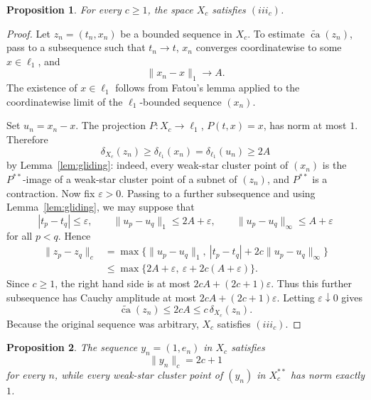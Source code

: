 \documentclass[11pt]{article}
\newtheorem{proposition}{Proposition}
\newcommand{\ellone}{\ell_1}
\newcommand{\wca}{\widetilde{\operatorname{ca}}}
\begin{document}
\begin{proposition}\label{prop:iii}
For every \(c\ge1\), the space \(X_c\) satisfies \((iii_c)\).
\end{proposition}

\begin{proof}
Let \(z_n=(t_n,x_n)\) be a bounded sequence in \(X_c\).  To estimate
\(\wca(z_n)\), pass to a subsequence such that \(t_n\to t\), \(x_n\) converges
coordinatewise to some \(x\in\ellone\), and
\[
  \|x_n-x\|_1\longrightarrow A.
\]
The existence of \(x\in\ellone\) follows from Fatou's lemma applied to the
coordinatewise limit of the \(\ellone\)-bounded sequence \((x_n)\).

Set \(u_n=x_n-x\).  The projection \(P:X_c\to\ellone\), \(P(t,x)=x\), has
norm at most \(1\).  Therefore
\[
  \delta_{X_c}(z_n)\ge \delta_{\ellone}(x_n)
  =\delta_{\ellone}(u_n)\ge 2A
\]
by Lemma~\ref{lem:gliding}: indeed, every weak-star cluster point of
\((x_n)\) is the \(P^{**}\)-image of a weak-star cluster point of a subnet of
\((z_n)\), and \(P^{**}\) is a contraction.  Now fix \(\varepsilon>0\).  Passing to a further
subsequence and using Lemma~\ref{lem:gliding}, we may suppose that
\[
  |t_p-t_q|\le\varepsilon,\qquad
  \|u_p-u_q\|_1\le2A+\varepsilon,\qquad
  \|u_p-u_q\|_\infty\le A+\varepsilon
\]
for all \(p<q\).  Hence
\[
\begin{aligned}
  \|z_p-z_q\|_c
  &=
  \max\{\|u_p-u_q\|_1,\ |t_p-t_q|+2c\|u_p-u_q\|_\infty\} \\
  &\le
  \max\{2A+\varepsilon,\ \varepsilon+2c(A+\varepsilon)\}.
\end{aligned}
\]
Since \(c\ge1\), the right hand side is at most
\(2cA+(2c+1)\varepsilon\).  Thus this further subsequence has Cauchy
amplitude at most \(2cA+(2c+1)\varepsilon\).  Letting
\(\varepsilon\downarrow0\) gives
\[
  \wca(z_n)\le 2cA\le c\,\delta_{X_c}(z_n).
\]
Because the original sequence was arbitrary, \(X_c\) satisfies \((iii_c)\).
\end{proof}

\begin{proposition}\label{prop:cluster}
The sequence \(y_n=(1,e_n)\) in \(X_c\) satisfies
\[
  \|y_n\|_c=2c+1
\]
for every \(n\), while every weak-star cluster point of \((y_n)\) in
\(X_c^{**}\) has norm exactly \(1\).
\end{proposition}
\end{document}
